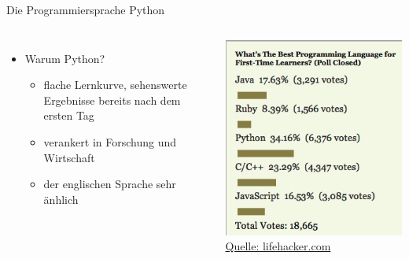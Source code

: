 \begin{frame}{Die Programmiersprache Python}
\begin{columns}
    \begin{itemize}
        \item Warum Python?
            \begin{itemize}
                \item flache Lernkurve, sehenswerte Ergebnisse bereits nach dem ersten Tag
                \item verankert in Forschung und Wirtschaft
                \item der englischen Sprache sehr änhlich
            \end{itemize}
    \end{itemize}
    \centering\includegraphics[scale=0.5]{images/best_lang} 
    \hyperlink{https://lifehacker.com/five-best-programming-languages-for-first-time-learners-1494256243}{\tiny{Quelle: lifehacker.com}}
\end{columns}
\end{frame}

\begin{frame}[standout]
    \pythonenglish
\end{frame}

